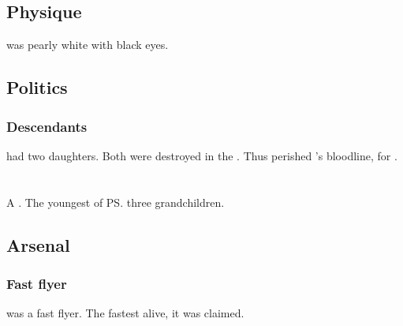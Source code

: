 \subsection{Physique}
\Nexagglachel was pearly white with black eyes. 









\subsection{Politics}





\subsubsection{Descendants}
\Nexagglachel had two daughters.
Both were destroyed in the .
Thus perished 's bloodline, for . 














\section{\Rathyon}
\index{\Rathyon}
A \dragon. 
The youngest of \ps{\QuessanthIshnaruchaefir} three grandchildren. 









\subsection{Arsenal}
\subsubsection{Fast flyer}
\Rathyon{} was a fast flyer. 
The fastest \dragon{} alive, it was claimed. 









